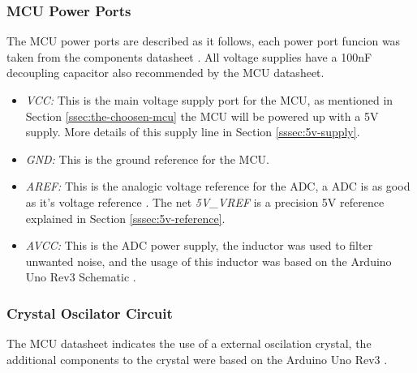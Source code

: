			\subsubsection{MCU Power Ports}\label{sssec:mcu-power-ports}
				The MCU power ports are described as it follows, each power port funcion was taken from the components datasheet \cite{atmega328p-datasheet}. All voltage supplies have a 100nF decoupling capacitor also recommended by the MCU datasheet.

				\begin{itemize}
					\item \textit{VCC: } This is the main voltage supply port for the MCU, as mentioned in Section \ref {ssec:the-choosen-mcu} the MCU will be powered up with a 5V supply. More details of this supply line in Section \ref{sssec:5v-supply}.
					\item \textit{GND: } This is the ground reference for the MCU.
					\item \textit{AREF: } This is the analogic voltage reference for the ADC, a ADC is as good as it's voltage reference \cite{adc-good}. The net \textit{5V_VREF} is a precision 5V reference explained in Section \ref{sssec:5v-reference}.
					\item \textit{AVCC: } This is the ADC power supply, the inductor was used to filter unwanted noise, and the usage of this inductor was based on the Arduino Uno Rev3 Schematic \cite{arduino-rev3-schematic}.
				\end{itemize}

			\subsubsection{Crystal Oscilator Circuit}\label{sssec:mcu-crystal-oscilator}

				The MCU datasheet indicates the use of a external oscilation crystal, the additional components to the crystal were based on the Arduino Uno Rev3 \cite{arduino-rev3-schematic}.